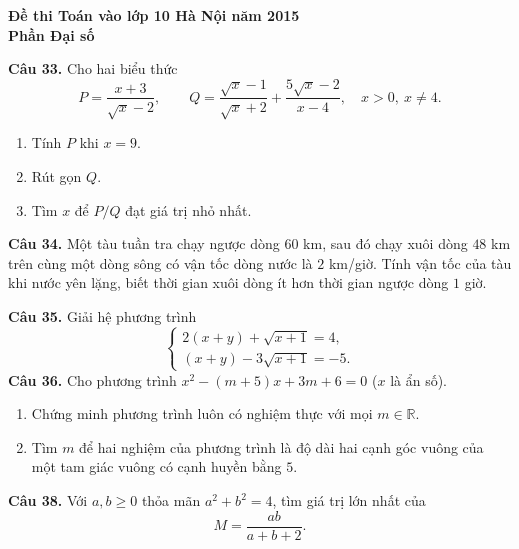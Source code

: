 \documentclass[12pt,a4paper]{article}
\begin{document}
\begin{center}{\Large\bfseries Đề thi Toán vào lớp 10 Hà Nội năm 2015\\Phần Đại số}\end{center}
\textbf{Câu 33.} Cho hai biểu thức
\[
P=\frac{x+3}{\sqrt{x}-2},\qquad Q=\frac{\sqrt{x}-1}{\sqrt{x}+2}+\frac{5\sqrt{x}-2}{x-4},
\quad x>0,\ x\ne4.
\]
\begin{enumerate}[label=\alph*)]
\item Tính $P$ khi $x=9$.
\item Rút gọn $Q$.
\item Tìm $x$ để $P/Q$ đạt giá trị nhỏ nhất.
\end{enumerate}
\textbf{Câu 34.} Một tàu tuần tra chạy ngược dòng $60$ km, sau đó chạy xuôi dòng $48$ km trên cùng một dòng sông có vận tốc dòng nước là $2$ km/giờ. Tính vận tốc của tàu khi nước yên lặng, biết thời gian xuôi dòng ít hơn thời gian ngược dòng $1$ giờ.

\textbf{Câu 35.} Giải hệ phương trình
\[
\begin{cases}
2(x+y)+\sqrt{x+1}=4,\\
(x+y)-3\sqrt{x+1}=-5.
\end{cases}
\]
\textbf{Câu 36.} Cho phương trình $x^2-(m+5)x+3m+6=0$ ($x$ là ẩn số).
\begin{enumerate}[label=\alph*)]
\item Chứng minh phương trình luôn có nghiệm thực với mọi $m\in\mathbb R$.
\item Tìm $m$ để hai nghiệm của phương trình là độ dài hai cạnh góc vuông của một tam giác vuông có cạnh huyền bằng $5$.
\end{enumerate}
\textbf{Câu 38.} Với $a,b\ge0$ thỏa mãn $a^2+b^2=4$, tìm giá trị lớn nhất của
\[
M=\frac{ab}{a+b+2}.
\]
\end{document}
